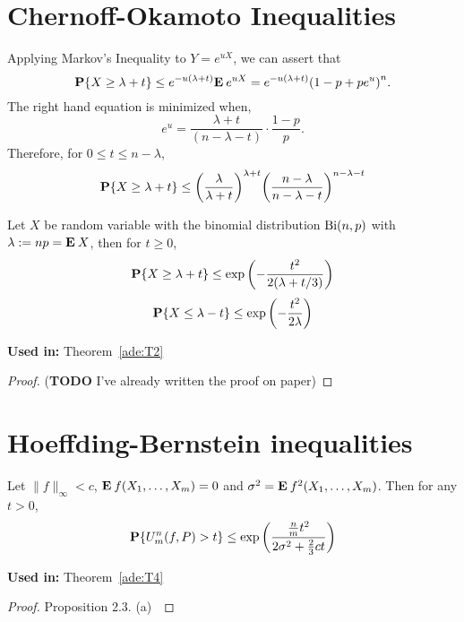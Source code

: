 \section{Chernoff-Okamoto Inequalities}

Applying Markov's Inequality to $Y = e^{uX}$, we can assert that
  \[
    \P\{X \geq \lambda + t\} \leq e^{-u(\lambda+t)} \E e^{uX} = e^{-u(\lambda+ t)} {(1-p + p e^{u})}^n. 
  \] 
  The right hand equation is minimized when,
  \[ e^{u} = \frac{\lambda+t}{(n-\lambda-t)} \cdot \frac{1-p}{p}. \]
  Therefore, for $0 \leq t \leq n-\lambda$,
  \begin{equation}\label{co:1}
    \P\{X \geq \lambda + t\} \leq {\left(\frac{\lambda}{\lambda+t}\right)}^{\lambda + t} {\left(\frac{n-\lambda}{n-\lambda-t}\right)}^{n - \lambda - t}
  \end{equation}

\begin{theorem}\label{co:T1}
  Let $X$ be random variable with the binomial distribution $\Bi(n,p)$ with $\lambda := np = \E X$, then for $t \geq 0$,
  \begin{equation}\label{co:2}
    \P\{X \geq \lambda + t\} \leq \exp\left(- \frac{t^2}{2(\lambda+t/3)}\right)
  \end{equation}
  \begin{equation}\label{co:3}
    \P\{X \leq \lambda - t\} \leq \exp\left(- \frac{t^2}{2\lambda}\right)
  \end{equation}
\end{theorem}

\textbf{Used in:} Theorem~\ref{ade:T2}

\begin{proof}
  (\textbf{TODO} I've already written the proof on paper)
\end{proof}

\section{Hoeffding-Bernstein inequalities}

\begin{theorem}\label{hb:T1}
  Let $\|f\|_\infty < c$, $\E f(X_1,\ldots, X_m) = 0$ and $\sigma^2 = \E f^2(X_1,\ldots, X_m)$. Then for any $t > 0$,
  \begin{equation}
    \P\{U_m^n(f,P) > t\} \leq \exp \left(\dfrac{\tfrac{n}{m}t^2}{2\sigma^2 + \tfrac{2}{3}ct}\right)
  \end{equation}
\end{theorem}

\textbf{Used in:} Theorem~\ref*{ade:T4}

\begin{proof}
  Proposition 2.3. (a)~\cite{arcones1993limit}
\end{proof}


